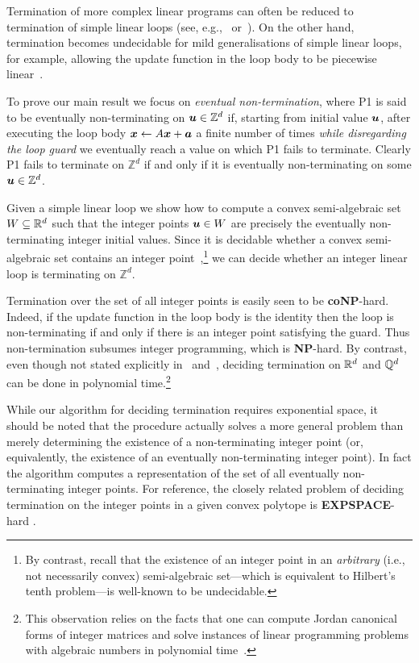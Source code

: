 Termination of more complex linear programs can often be reduced to
termination of simple linear loops (see, e.g.,~\cite{CookPR06}
or~\cite[Section 6]{Tiw04}).  On the other hand, termination becomes
undecidable for mild generalisations of simple linear loops, for
example, allowing the update function in the loop body to be piecewise
linear~\cite{BGM12}.

To prove our main result we focus on \emph{eventual non-termination},
where \textsf{P1} is said to be eventually non-terminating on
$\boldsymbol{u} \in \mathbb{Z}^d$ if, starting from initial value
$\boldsymbol{u}$, after executing the loop body $\boldsymbol{x} \gets
A\boldsymbol{x}+\boldsymbol{a}$ a finite number of times \emph{while
  disregarding the loop guard} we eventually reach a value on which
\textsf{P1} fails to terminate.  Clearly \textsf{P1} fails to
terminate on $\mathbb{Z}^d$ if and only if it is eventually
non-terminating on some $\boldsymbol{u} \in \mathbb{Z}^d$.

Given a simple linear loop we show how to compute a convex
semi-algebraic set $W \subseteq \mathbb{R}^d$ such that the integer
points $\boldsymbol{u} \in W$ are precisely the eventually
non-terminating integer initial values.  Since it is decidable whether
a convex semi-algebraic set contains an integer
point~\cite{KhachiyanP97},\footnote{By contrast, recall that the
  existence of an integer point in an \emph{arbitrary} (i.e., not
  necessarily convex) semi-algebraic set---which is equivalent to
  Hilbert's tenth problem---is well-known to be undecidable.} we can
decide whether an integer linear loop is terminating on
$\mathbb{Z}^d$.

Termination over the set of all integer points is easily seen to be
\textbf{coNP}-hard.  Indeed, if the update function in the loop body
is the identity then the loop is non-terminating if and only if there
is an integer point satisfying the guard.  Thus non-termination
subsumes integer programming, which is \textbf{NP}-hard.  By contrast,
even though not stated explicitly in~\cite{Tiw04} and~\cite{Bra06},
deciding termination on $\mathbb{R}^d$ and $\mathbb{Q}^d$ can be done
in polynomial time.\footnote{This observation relies on the facts that
  one can compute Jordan canonical forms of integer matrices and solve
  instances of linear programming problems with algebraic numbers in
  polynomial time~\cite{Cai94,AdlerB94}.}

While our algorithm for deciding termination requires exponential
space, it should be noted that the procedure actually solves a more
general problem than merely determining the existence of a
non-terminating integer point (or, equivalently, the existence of an
eventually non-terminating integer point).  In fact the algorithm
computes a representation of the set of all eventually non-terminating
integer points.  For reference, the closely related problem of
deciding termination on the integer points in a given convex polytope is
\textbf{EXPSPACE}-hard \cite{BGM12}.

